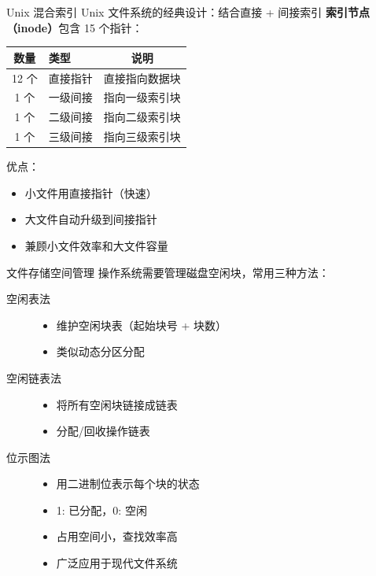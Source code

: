 \documentclass[10pt, aspectratio=169]{beamer}
\begin{document}
\begin{frame}{Unix 混合索引}
    Unix 文件系统的经典设计：结合直接 + 间接索引
    \vspace{0.5em}
    \textbf{索引节点（inode）}包含 15 个指针：
    \begin{center}
        \begin{tabular}{|c|l|c|}
            \hline
            \textbf{数量} & \textbf{类型} & \textbf{说明} \\
            \hline
            12 个 & 直接指针 & 直接指向数据块 \\
            1 个 & 一级间接 & 指向一级索引块 \\
            1 个 & 二级间接 & 指向二级索引块 \\
            1 个 & 三级间接 & 指向三级索引块 \\
            \hline
        \end{tabular}
    \end{center}
    \vspace{0.5em}
    优点：
    \begin{itemize}
        \item 小文件用直接指针（快速）
        \item 大文件自动升级到间接指针
        \item 兼顾小文件效率和大文件容量
    \end{itemize}
\end{frame}

\begin{frame}{文件存储空间管理}
    操作系统需要管理磁盘空闲块，常用三种方法：
    \vspace{0.5em}
    \begin{description}
        \item[空闲表法]
            \begin{itemize}
                \item 维护空闲块表（起始块号 + 块数）
                \item 类似动态分区分配
            \end{itemize}
        \item[空闲链表法]
            \begin{itemize}
                \item 将所有空闲块链接成链表
                \item 分配/回收操作链表
            \end{itemize}
        \item[位示图法]
            \begin{itemize}
                \item 用二进制位表示每个块的状态
                \item 1: 已分配，0: 空闲
                \item 占用空间小，查找效率高
                \item 广泛应用于现代文件系统
            \end{itemize}
    \end{description}
\end{frame}
\end{document}
